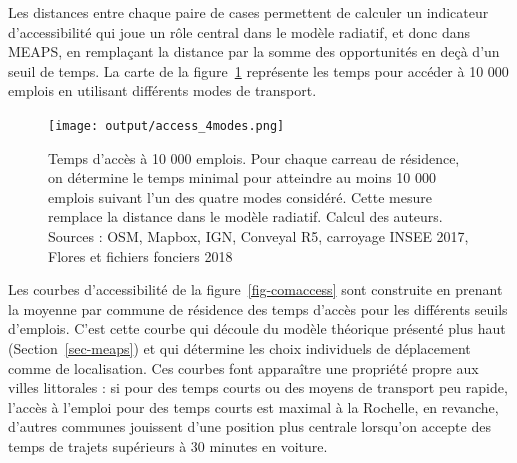 \documentclass[
  10pt,
  a4paper,
  numbers=noendperiod,
  DIV=12]{scrartcl}
\begin{document}
Les distances entre chaque paire de cases permettent de calculer un
indicateur d'accessibilité qui joue un rôle central dans le modèle
radiatif, et donc dans MEAPS, en remplaçant la distance par la somme des
opportunités en deçà d'un seuil de temps. La carte de la
figure~\ref{fig-4access} représente les temps pour accéder à 10 000
emplois en utilisant différents modes de transport.

\begin{figure}[htb]

{\centering \texttt{[image: output/access\_4modes.png]}

}

\caption[Accessibilité à 10 000 emplois pour la
Rochelle]{\label{fig-4access}Temps d'accès à 10 000 emplois. Pour chaque
carreau de résidence, on détermine le temps minimal pour atteindre au
moins 10 000 emplois suivant l'un des quatre modes considéré. Cette
mesure remplace la distance dans le modèle radiatif. Calcul des auteurs.
Sources : OSM, Mapbox, IGN, Conveyal R5, carroyage INSEE 2017, Flores et
fichiers fonciers 2018}

\end{figure}

Les courbes d'accessibilité de la figure~\ref{fig-comaccess} sont
construite en prenant la moyenne par commune de résidence des temps
d'accès pour les différents seuils d'emplois. C'est cette courbe qui
découle du modèle théorique présenté plus haut (Section~\ref{sec-meaps})
et qui détermine les choix individuels de déplacement comme de
localisation. Ces courbes font apparaître une propriété propre aux
villes littorales : si pour des temps courts ou des moyens de transport
peu rapide, l'accès à l'emploi pour des temps courts est maximal à la
Rochelle, en revanche, d'autres communes jouissent d'une position plus
centrale lorsqu'on accepte des temps de trajets supérieurs à 30 minutes
en voiture.
\end{document}
